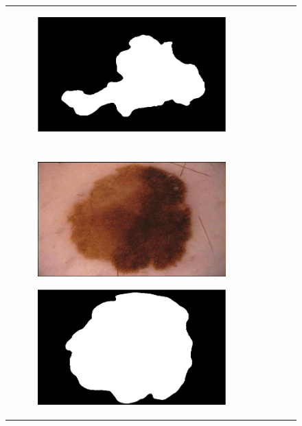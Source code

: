 \documentclass[a4paper, 10pt, conference]{ieeeconf}        %
\begin{document}
\begin{figure}[ht!]
\begin{tabular}{c c c c c}
\begin{subfigure}{0.2\textwidth}
          \end{subfigure} 
         \begin{subfigure}{0.2\textwidth}
          \includegraphics[scale=0.2]{finalGroundTrue_05.JPG}
          \end{subfigure} \\ \\
   \begin{subfigure}{0.2\textwidth}
   \includegraphics[scale=0.15]{original06.JPG}
   \end{subfigure}
   \begin{subfigure}{0.2\textwidth}
   \includegraphics[scale=0.2]{expert_1GroundTrue_06.JPG}

\end{subfigure}
\end{tabular}
\end{figure}
\end{document}
